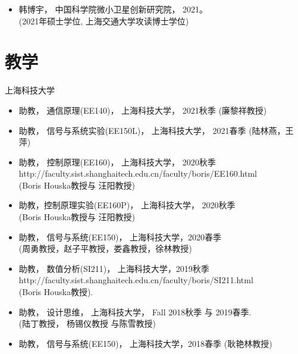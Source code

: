 \documentclass[paper=a4,fontsize=11pt]{scrartcl} %
\newlength{\spacebox}
\newcommand{\NewPart}[1]{\section*{\uppercase{#1}}}
\newcommand{\PersonalEntry}[2]{
		\noindent\hangindent=2em\hangafter=0 %
		\parbox{\spacebox}{        %
		\textit{#1}}		       %
		\hspace{1.5em} #2 \par}    %
\newcommand{\SkillsEntry}[2]{      %
		\noindent\hangindent=2em\hangafter=0 %
		\parbox{\spacebox}{        %
		\textit{#1}}			   %
		\hspace{1.5em} #2 \par}    %
\begin{document}
\begin{CJK*}{UTF8}{gbsn}
\begin{itemize}
	
	\item 韩博宇， 中国科学院微小卫星创新研究院， 2021。\\
	(2021年硕士学位, 上海交通大学攻读博士学位)

\end{itemize}

\NewPart{教学}{上海科技大学}
\begin{itemize}
	
	
	\item{助教， 	通信原理(EE140)， 上海科技大学， 2021秋季 (廉黎祥教授)}
	
	\item{助教，  信号与系统实验(EE150L)， 上海科技大学， 2021春季 (陆林燕，王萍)}
	
	\item{助教， 控制原理(EE160)， 上海科技大学， 2020秋季\\ 
		http://faculty.sist.shanghaitech.edu.cn/faculty/boris/EE160.html\\
		(Boris Houska教授与 汪阳教授)
	}
	
	\item{助教，控制原理实验(EE160P)， 上海科技大学， 2020秋季\\ (Boris Houska教授与 汪阳教授)}
	
	\item{助教， 信号与系统(EE150)，  上海科技大学，2020春季 \\ (周勇教授，赵子平教授，娄鑫教授，徐林教授)}
	
	\item{助教， 数值分析(SI211)， 上海科技大学，2019秋季\\ 
		{http://faculty.sist.shanghaitech.edu.cn/faculty/boris/SI211.html}\\
		(Boris Houska教授).
	}
	
	\item{助教， 设计思维， 上海科技大学， Fall 2018秋季 与 2019春季.\\ (陆丁教授， 杨锡仪教授 与陈雪教授) }
	
	\item{助教， 信号与系统(EE150)，  上海科技大学，2018春季 (耿艳林教授)
		}


	
\end{itemize}



\end{CJK*}
\end{document}
